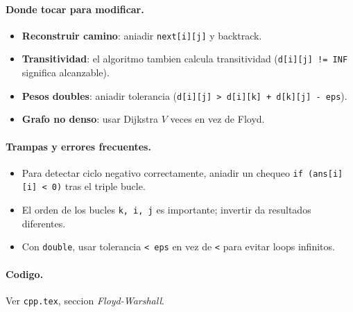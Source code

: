 \paragraph{Donde tocar para modificar.}
\begin{itemize}\setlength\itemsep{0pt}
	\item \textbf{Reconstruir camino}: aniadir \texttt{next[i][j]} y backtrack.
	\item \textbf{Transitividad}: el algoritmo tambien calcula transitividad (\texttt{d[i][j] != INF} significa alcanzable).
	\item \textbf{Pesos doubles}: aniadir tolerancia (\texttt{d[i][j] > d[i][k] + d[k][j] - eps}).
	\item \textbf{Grafo no denso}: usar Dijkstra $V$ veces en vez de Floyd.
\end{itemize}

\paragraph{Trampas y errores frecuentes.}
\begin{itemize}\setlength\itemsep{0pt}
	\item Para detectar ciclo negativo correctamente, aniadir un chequeo \texttt{if (ans[i][i] < 0)} tras el triple bucle.
	\item El orden de los bucles \texttt{k, i, j} es importante; invertir da resultados diferentes.
	\item Con \texttt{double}, usar tolerancia \texttt{< eps} en vez de \texttt{<} para evitar loops infinitos.
\end{itemize}

\paragraph{Codigo.}
Ver \texttt{cpp.tex}, seccion \textit{Floyd-Warshall}.
